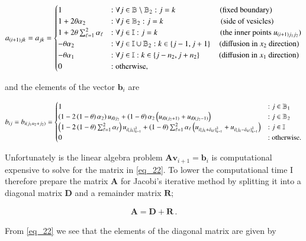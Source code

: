\documentclass[11pt,english,a4paper]{article}
\begin{document}
\begin{flushleft}
\begin{align}
a_{(i+1)jk} = a_{jk} = \begin{cases} 
1 &:\forall j\in\mathbb{B}\setminus\mathbb{B}_2  : j=k \,\,\,\,\quad\qquad\qquad \text{(fixed boundary)}\\
1+ 2\theta \alpha_2 &: \forall j\in\mathbb{B}_2: j=k \,\,\quad\qquad\qquad\qquad (\text{side of vesicles}) \\ 
1+ 2\theta \sum_{\ell = 1}^2 \alpha_\ell &: \forall j\in\mathbb{I}: j=k \qquad\qquad\qquad\qquad (\text{the inner points }u_{(i+1)j_1j_2}) \\ 
-\theta \alpha_2 &: \forall j\in\mathbb{I}\cup\mathbb{B}_2: k\in\left\lbrace{j-1,j+1}\right\rbrace\quad \text{(diffusion in $x_2$ direction)} \\ 
- \theta \alpha_1 &: \forall j\in\mathbb{I} : k \in \left\lbrace{j-n_2,j+n_2}\right\rbrace \,\,\qquad\text{(diffusion in $x_1$ direction)} \\
 0 & : \text{otherwise,} \end{cases}
\label{eq_22}
\end{align}

and the elements of the vector $\textbf{b}_i$ are

\begin{align}
b_{ij} = b_{i(j_1 n_2 + j_2)} = \begin{cases}
1 &: j\in\mathbb{B}_1 \\
\left({1-2\left({1-\theta}\right)\alpha_2}\right) u_{i0j_2} + \left({1-\theta}\right)\alpha_2\left({u_{i0(j_2+1)} + u_{i0(j_2-1)}}\right) &: j\in\mathbb{B}_2 \\
\left({1-2\left({1-\theta}\right)\sum_{\ell = 1}^2 \alpha_\ell}\right) u_{i\left\lbrace{j_k}\right\rbrace_{k=1}^2} + \left({1-\theta}\right)\sum_{\ell=1}^2\alpha_\ell\left({u_{i\left\lbrace{j_k+\delta_{k\ell}}\right\rbrace_{k=1}^2} + u_{i\left\lbrace{j_k-\delta_{k\ell}}\right\rbrace_{k=1}^2}}\right) &: j\in\mathbb{I} \\
0 &: \text{otherwise.}
\end{cases}
\label{eq_23}
\end{align}

Unfortunately  is the linear algebra problem $\textbf{A}\textbf{v}_{i+1} = \textbf{b}_i$ is computational expensive to solve for the matrix in \eqref{eq_22}. To lower the computational time I therefore prepare the matrix $\textbf{A}$ for Jacobi's iterative method by splitting it into a diagonal matrix $\textbf{D}$ and a remainder matrix $\textbf{R}$;

\begin{align*}
\textbf{A} = \textbf{D} + \textbf{R} \,.
\end{align*}

From \eqref{eq_22} we see that the elements of the diagonal matrix are given by


\end{flushleft}
\end{document}
